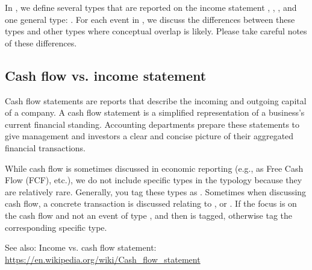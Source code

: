 In , we define several types that are reported on the income statement , , ,  and one general type: .
For each event in , we discuss the differences between these types and other types where conceptual overlap is likely. Please take careful notes of these differences.

\subsection{Cash flow vs. income statement}
Cash flow statements are reports that describe the incoming and outgoing capital of a company.
A cash flow statement is a simplified representation of a business's current financial standing.
Accounting departments prepare these statements to give management and investors a clear and concise picture of their aggregated financial transactions.

While cash flow is sometimes discussed in economic reporting (e.g., as Free Cash Flow (FCF), etc.), we do not include specific types in the typology because they are relatively rare.
Generally, you tag these types as .
Sometimes when discussing cash flow, a concrete transaction is discussed relating to ,  or .
If the focus is on the cash flow and not an event of type ,  and  then  is tagged, otherwise tag the corresponding specific type.

See also: Income vs. cash flow statement: \url{https://en.wikipedia.org/wiki/Cash\_flow\_statement}

